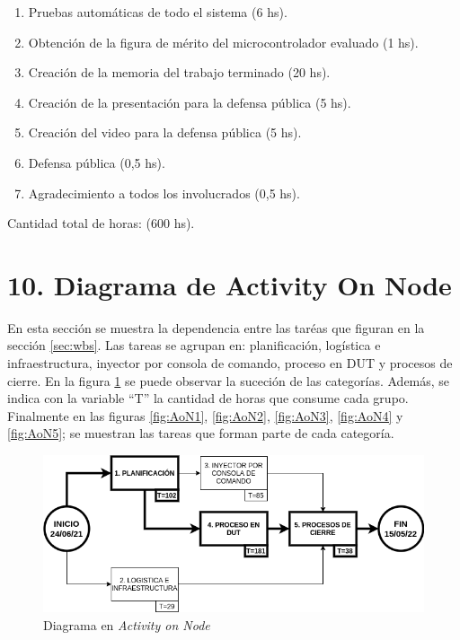 \documentclass[
11pt, %
]{charter}
\begin{document}
\begin{enumerate}
\begin{enumerate}
		\item Pruebas automáticas de todo el sistema (6 hs).
		\item Obtención de la figura de mérito del microcontrolador evaluado (1 hs).
		\item Creación de la memoria del trabajo terminado (20 hs).
		\item Creación de la presentación para la defensa pública (5 hs).
		\item Creación del video para la defensa pública (5 hs).
		\item Defensa pública (0,5 hs).
		\item Agradecimiento a todos los involucrados (0,5 hs).
	\end{enumerate}
\end{enumerate}

Cantidad total de horas: (600 hs).

\section{10. Diagrama de Activity On Node}
\label{sec:AoN}

En esta sección se muestra la dependencia entre las taréas que figuran en la sección \ref{sec:wbs}.
Las tareas se agrupan en: planificación, logística e infraestructura, inyector por consola de comando, proceso en DUT y procesos de cierre.
En la figura \ref{fig:AoN} se puede observar la suceción de las categorías.
Además, se indica con la variable ``T'' la cantidad de horas que consume cada grupo.
Finalmente en las figuras \ref{fig:AoN1}, \ref{fig:AoN2}, \ref{fig:AoN3}, \ref{fig:AoN4} y \ref{fig:AoN5}; se muestran las tareas que forman parte de cada categoría.

\begin{figure}[htpb]
\centering 
\includegraphics[width=.8\textwidth]{./Figuras/AoN.png}
\caption{Diagrama en \textit{Activity on Node}}
\label{fig:AoN}
\end{figure}
\end{document}
